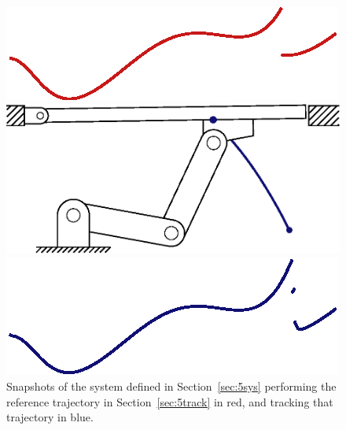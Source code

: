 \documentclass[../DC2019003Bouma.tex]{subfiles}
\begin{document}
\begin{figure}[bt!]
\begin{minipage}[c]{.3\textwidth}
	\begin{flushleft}
    \includegraphics[scale=0.55]{reference/refsnap_t120.eps}
	\end{flushleft}
    \includegraphics[width=\textwidth]{tracking/frame34.eps}
	\begin{flushleft}
    \includegraphics[scale=0.55]{tracking/trcsnap_t120.eps}
	\end{flushleft}
	\caption*{$t=1.200$}
\end{minipage}
\caption{Snapshots of the system defined in Section~\ref{sec:5sys} performing the reference trajectory in Section~\ref{sec:5track} in red, and tracking that trajectory in blue.}\label{fig:5ref}
\end{figure}
\end{document}
